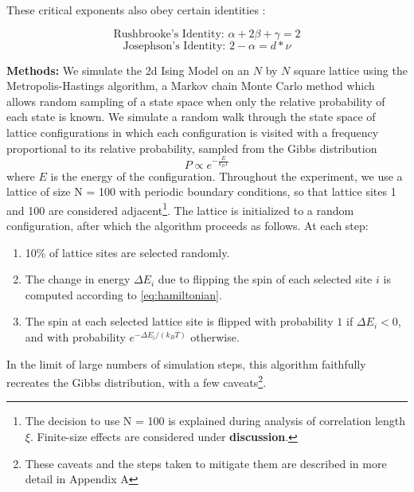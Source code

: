 \documentclass[letter,scriptaddress,twocolumn, prl,nofootinbib]{revtex4}
\begin{document}
These critical exponents also obey certain identities \cite{Stanley}:

\begin{equation}
	\text{Rushbrooke's Identity: } \alpha + 2\beta + \gamma = 2 \label{eq:rushbrooke}
\end{equation}
\begin{equation}
	\text{Josephson's Identity: } 2 - \alpha = d * \nu \label{eq:josephson}
\end{equation}

\textbf{Methods:} We simulate the 2d Ising Model on an $N$ by $N$ square lattice using the Metropolis-Hastings algorithm, a Markov chain Monte Carlo method which allows random sampling of a state space when only the relative probability of each state is known. We simulate a random walk through the state space of lattice configurations in which each configuration is visited with a frequency proportional to its relative probability, sampled from the Gibbs distribution
\begin{equation}
	P \propto e^{-\frac{E}{k_B T}}
\end{equation}
where $E$ is the energy of the configuration. Throughout the experiment, we use a lattice of size N = 100 with periodic boundary conditions, so that lattice sites 1 and 100 are considered adjacent\footnote{The decision to use N = 100 is explained during analysis of correlation length $\xi$. Finite-size effects are considered under \textbf{discussion}.}. The lattice is initialized to a random configuration, after which the algorithm proceeds as follows. At each step:
\begin{enumerate}
	\item 10\% of lattice sites are selected randomly.
	\item The change in energy $\Delta E_i$ due to flipping the spin of each selected site $i$ is computed according to \autoref{eq:hamiltonian}.
	\item The spin at each selected lattice site is flipped with probability $1$ if $\Delta E_i < 0$, and with probability $e^{-\Delta E_i/(k_BT)}$ otherwise.
\end{enumerate}

In the limit of large numbers of simulation steps, this algorithm faithfully recreates the Gibbs distribution, with a few caveats\footnote{These caveats and the steps taken to mitigate them are described in more detail in Appendix A}.
\end{document}
